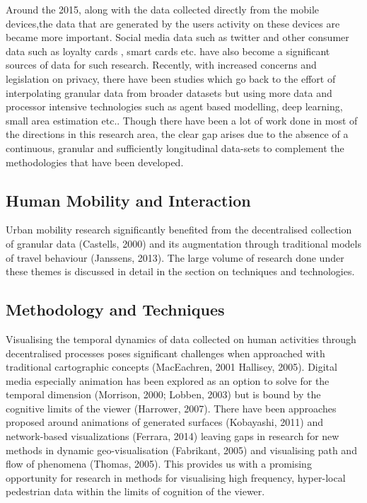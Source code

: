 Around the 2015, along with the data collected directly from the mobile devices,the data that are generated by the users activity on these devices are became more important.
Social media data such as twitter \citep{lansley2016} and other consumer data such as loyalty cards \citep{lloyd2018}, smart cards \citep{ordonez2012} etc. have also become a significant sources of data for such research.
Recently, with increased concerns and legislation on privacy, there have been studies which go back to the effort of interpolating granular data from broader datasets but using more data and processor intensive technologies such as agent based modelling, deep learning, small area estimation \cite[-2.5cm]{crols2019, shibata2019, rao2015} etc..
Though there have been a lot of work done in most of the directions in this research area, the clear gap arises due to the absence of a continuous, granular and sufficiently longitudinal data-sets to complement the methodologies that have been developed. 


\subsection{Human Mobility and Interaction}

Urban mobility research significantly benefited from the decentralised collection of granular data (Castells, 2000) and its augmentation through traditional models of travel behaviour (Janssens, 2013).
The large volume of research done under these themes is discussed in detail in the section on techniques and technologies.


\subsection{Methodology and Techniques}

Visualising the temporal dynamics of data collected on human activities through decentralised processes poses significant challenges when approached with traditional cartographic concepts (MacEachren, 2001 Hallisey, 2005).
Digital media especially animation has been explored as an option to solve for the temporal dimension (Morrison, 2000; Lobben, 2003) but is bound by the cognitive limits of the viewer (Harrower, 2007).
There have been approaches proposed around animations of generated surfaces (Kobayashi, 2011) and network-based visualizations (Ferrara, 2014) leaving gaps in research for new methods in dynamic geo-visualisation (Fabrikant, 2005) and visualising path and flow of phenomena (Thomas, 2005).
This provides us with a promising opportunity for research in methods for visualising high frequency, hyper-local pedestrian data within the limits of cognition of the viewer.


